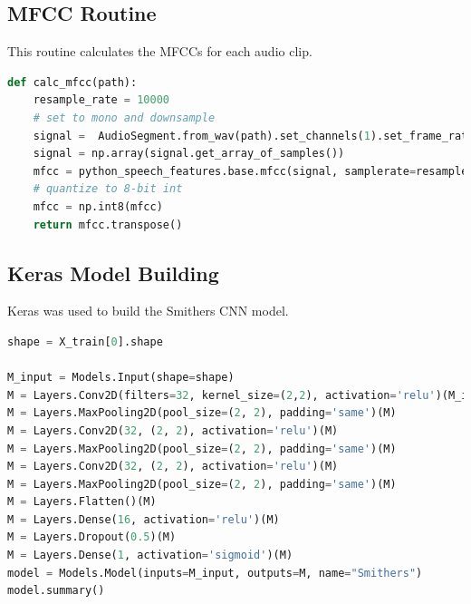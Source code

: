 \documentclass[conference]{IEEEtran}
\begin{document}
\subsection{MFCC Routine}\label{appendix:mfcc}
This routine calculates the MFCCs for each audio clip.

\begin{lstlisting}[language=Python]
def calc_mfcc(path):
    resample_rate = 10000
    # set to mono and downsample
    signal =  AudioSegment.from_wav(path).set_channels(1).set_frame_rate(resample_rate)
    signal = np.array(signal.get_array_of_samples())
    mfcc = python_speech_features.base.mfcc(signal, samplerate=resample_rate, winstep=0.025, numcep=13, winfunc=np.hanning)
    # quantize to 8-bit int
    mfcc = np.int8(mfcc)
    return mfcc.transpose()
\end{lstlisting}

\subsection{Keras Model Building} \label{appendix:model}
Keras was used to build the Smithers CNN model.

\begin{lstlisting}[language=Python]
shape = X_train[0].shape

M_input = Models.Input(shape=shape)
M = Layers.Conv2D(filters=32, kernel_size=(2,2), activation='relu')(M_input)
M = Layers.MaxPooling2D(pool_size=(2, 2), padding='same')(M)
M = Layers.Conv2D(32, (2, 2), activation='relu')(M)
M = Layers.MaxPooling2D(pool_size=(2, 2), padding='same')(M)
M = Layers.Conv2D(32, (2, 2), activation='relu')(M)
M = Layers.MaxPooling2D(pool_size=(2, 2), padding='same')(M)
M = Layers.Flatten()(M)
M = Layers.Dense(16, activation='relu')(M)
M = Layers.Dropout(0.5)(M)
M = Layers.Dense(1, activation='sigmoid')(M)
model = Models.Model(inputs=M_input, outputs=M, name="Smithers")
model.summary()   
\end{lstlisting}
\end{document}
